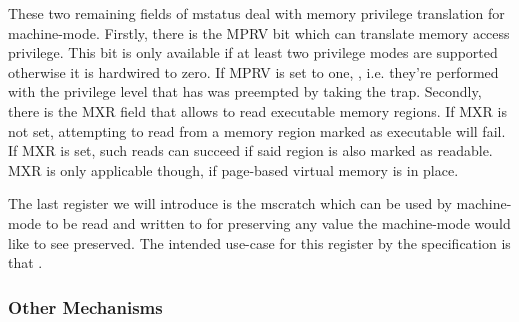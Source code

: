 These two remaining fields of \gls{mstatus} deal with memory privilege translation for machine-mode.
Firstly, there is the MPRV bit which can translate memory access privilege.
This bit is only available if at least two privilege modes are supported otherwise it is hardwired to zero.
If MPRV is set to one, , i.e. they're performed with the privilege level that has was preempted by taking the trap.
Secondly, there is the MXR field that allows to read executable memory regions.
If MXR is not set, attempting to read from a memory region marked as executable will fail.
If MXR is set, such reads can succeed if said region is also marked as readable.
MXR is only applicable though, if page-based virtual memory is in place.

The last register we will introduce is the \gls{mscratch} which can be used by machine-mode to be read and written to for preserving any value the machine-mode would like to see preserved.
The intended use-case for this register by the specification is that .


\subsubsection{Other Mechanisms}
\label{sec:other-mechs}

